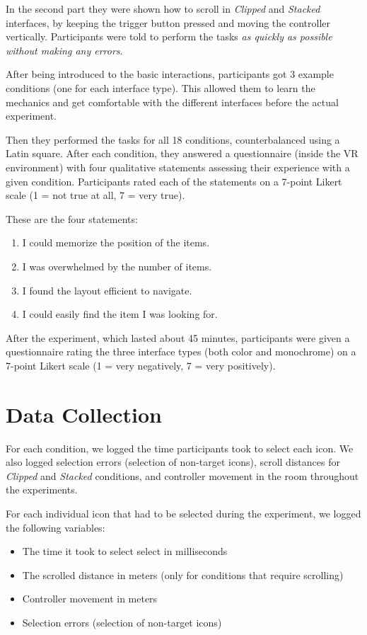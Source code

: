 \documentclass{tufte-book} %
\begin{document}
In the second part they were shown how to scroll in \emph{Clipped} and \emph{Stacked} interfaces, by keeping the trigger button pressed and moving the controller vertically.
Participants were told to perform the tasks \emph{as quickly as possible without making any errors}.

After being introduced to the basic interactions, participants got 3 example conditions (one for each interface type). This allowed them to learn the mechanics and get comfortable with the different interfaces before the actual experiment.

Then they performed the tasks for all 18 conditions, counterbalanced using a Latin square. After each condition, they answered a questionnaire (inside the VR environment) with four qualitative statements assessing their experience with a given condition. Participants rated each of the statements on a 7-point Likert scale (1 = not true at all, 7 = very true).

These are the four statements:

\begin{enumerate}[label=\arabic*. , wide=0.5em,  leftmargin=*]
  \item I could memorize the position of the items.
  \item I was overwhelmed by the number of items.
  \item I found the layout efficient to navigate.
  \item I could easily find the item I was looking for.
\end{enumerate}

After the experiment, which lasted about 45 minutes, participants were given a questionnaire rating the three interface types (both color and monochrome) on a 7-point Likert scale (1 = very negatively, 7 = very positively).

\section{Data Collection}
For each condition, we logged the time participants took to select each icon. We also logged selection errors (selection of non-target icons), scroll distances for \emph{Clipped} and \emph{Stacked} conditions, and controller movement in the room throughout the experiments.

For each individual icon that had to be selected during the experiment, we logged the following variables:

\begin{itemize}
  \item The time it took to select select in milliseconds
  \item The scrolled distance in meters (only for conditions that require scrolling)
  \item Controller movement in meters
  \item Selection errors (selection of non-target icons)
\end{itemize}
\end{document}
